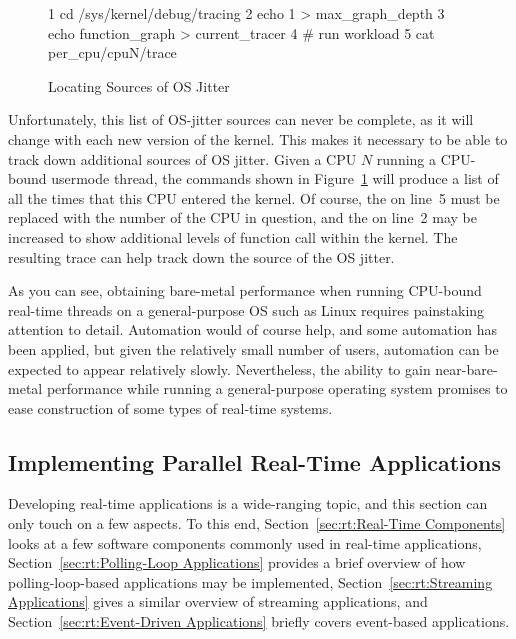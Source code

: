 \begin{figure}[tb]
{ \scriptsize
\begin{verbbox}
 1 cd /sys/kernel/debug/tracing
 2 echo 1 > max_graph_depth
 3 echo function_graph > current_tracer
 4 # run workload
 5 cat per_cpu/cpuN/trace
\end{verbbox}
}
\centering
\theverbbox
\caption{Locating Sources of OS Jitter}
\label{fig:rt:Locating Sources of OS Jitter}
\end{figure}

Unfortunately, this list of OS-jitter sources can never be complete,
as it will change with each new version of the kernel.
This makes it necessary to be able to track down additional sources
of OS jitter.
Given a CPU $N$ running a CPU-bound usermode thread, the
commands shown in
Figure~\ref{fig:rt:Locating Sources of OS Jitter}
will produce a list of all the times that this CPU entered the kernel.
Of course, the  on line~5 must be replaced with the
number of the CPU in question, and the  on line~2 may be increased
to show additional levels of function call within the kernel.
The resulting trace can help track down the source of the OS jitter.

As you can see, obtaining bare-metal performance when running
CPU-bound real-time threads on a general-purpose OS such as Linux
requires painstaking attention to detail.
Automation would of course help, and some automation has been applied,
but given the relatively small number of users, automation can be
expected to appear relatively slowly.
Nevertheless, the ability to gain near-bare-metal performance while
running a general-purpose operating system promises to ease construction
of some types of real-time systems.

\subsection{Implementing Parallel Real-Time Applications}
\label{sec:rt:Implementing Parallel Real-Time Applications}

Developing real-time applications is a wide-ranging topic, and this
section can only touch on a few aspects.
To this end,
Section~\ref{sec:rt:Real-Time Components}
looks at a few software components commonly used in real-time applications,
Section~\ref{sec:rt:Polling-Loop Applications}
provides a brief overview of how polling-loop-based applications may
be implemented,
Section~\ref{sec:rt:Streaming Applications}
gives a similar overview of streaming applications, and
Section~\ref{sec:rt:Event-Driven Applications}
briefly covers event-based applications.


